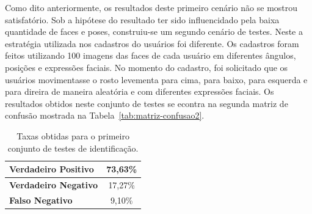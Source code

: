 	Como dito anteriormente, os resultados deste primeiro cenário não se mostrou satisfatório. Sob a hipótese do resultado ter sido influencidado pela baixa quantidade de faces e poses, construiu-se um segundo cenário de testes. Neste a estratégia utilizada nos cadastros do usuários foi diferente. Os cadastros foram feitos utilizando 100 imagens das faces de cada usuário em diferentes ângulos, posições e expressões faciais. No momento do cadastro, foi solicitado que os usuários movimentasse o rosto levementa para cima, para baixo, para esquerda e para direira de maneira aleatória e com diferentes expressões faciais. Os resultados obtidos neste conjunto de testes se econtra na segunda matriz de confusão mostrada na Tabela~\ref{tab:matriz-confusao2}.

	\begin{table}[htb]
		\begin{center}
			\caption{Taxas obtidas para o primeiro conjunto de testes de identificação.}
			\label{tab:taxas}
			\begin{tabular}{|l|c|}
				\hline \bf Verdadeiro Positivo & 73,63\% \\
				\hline \bf Verdadeiro Negativo & 17,27\% \\
				\hline \bf Falso Negativo & 9,10\% \\
				\hline
			\end{tabular}
		\end{center}
	\end{table}



				 

